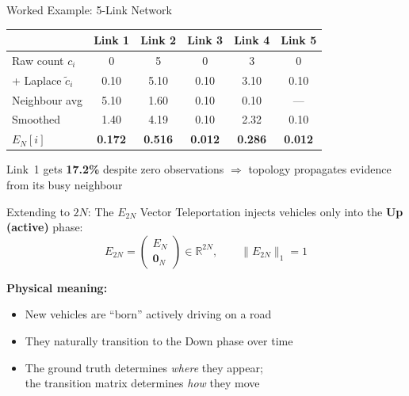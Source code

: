 \documentclass[aspectratio=169,12pt]{beamer}
\newcommand{\highlight}[1]{\textcolor{accent}{\textbf{#1}}}
\newcommand{\good}[1]{\textcolor{good}{\textbf{#1}}}
\begin{document}
\begin{frame}{Worked Example: 5-Link Network}
  \centering

  \medskip
  \small
  \begin{tabular}{lccccc}
    \toprule
    & Link 1 & Link 2 & Link 3 & Link 4 & Link 5\\
    \midrule
    Raw count $c_i$ & 0 & 5 & 0 & 3 & 0\\
    + Laplace $\tilde{c}_i$ & 0.10 & 5.10 & 0.10 & 3.10 & 0.10\\
    Neighbour avg & 5.10 & 1.60 & 0.10 & 0.10 & ---\\
    Smoothed & 1.40 & 4.19 & 0.10 & 2.32 & 0.10\\
    \highlight{$E_N[i]$} & \highlight{0.172} & \highlight{0.516}
      & \highlight{0.012} & \highlight{0.286} & \highlight{0.012}\\
    \bottomrule
  \end{tabular}

  \medskip
  Link~1 gets \good{17.2\%} despite zero observations
  $\Rightarrow$ topology propagates evidence from its busy neighbour
\end{frame}

\begin{frame}{Extending to $2N$: The $E_{2N}$ Vector}
  Teleportation injects vehicles only into the \highlight{Up (active)} phase:
  \[
    \boxed{E_{2N} = \begin{pmatrix} E_N \\ \mathbf{0}_N \end{pmatrix}}
    \in \mathbb{R}^{2N}, \qquad \|E_{2N}\|_1 = 1
  \]

  \bigskip
  \textbf{Physical meaning:}
  \begin{itemize}
    \item New vehicles are ``born'' actively driving on a road
    \item They naturally transition to the Down phase over time
    \item The ground truth determines \emph{where} they appear;\\
          the transition matrix determines \emph{how} they move
  \end{itemize}
\end{frame}
\end{document}

